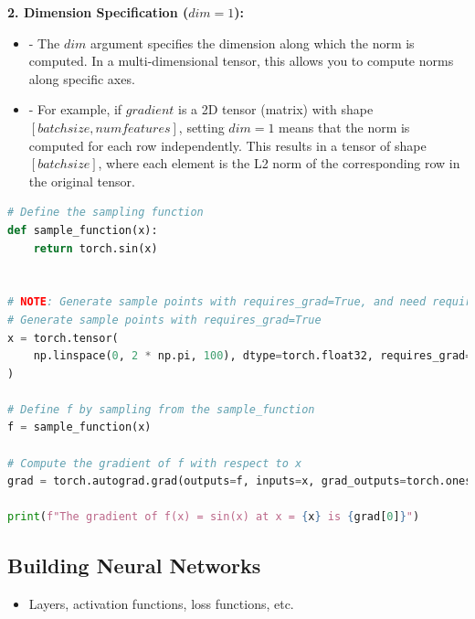 \documentclass{article}
\begin{document}
\textbf{2. Dimension Specification ($dim=1$):} \\

   \begin{itemize}
     \item    - The $dim$ argument specifies the dimension along which the norm is computed. In a multi-dimensional tensor, this allows you to compute norms along specific axes. \\
     \item    - For example, if $gradient$ is a 2D tensor (matrix) with shape $[batch size, num features]$, setting $dim=1$ means that the norm is computed for each row independently.
   This results in a tensor of shape $[batch size]$, where each element is the L2 norm of the corresponding row in the original tensor. \\

   \end{itemize}

\begin{lstlisting}[language=Python, caption=PyTorch gradient sampling example]
# Define the sampling function
def sample_function(x):
    return torch.sin(x)


# NOTE: Generate sample points with requires_grad=True, and need requires_grad=True
# Generate sample points with requires_grad=True
x = torch.tensor(
    np.linspace(0, 2 * np.pi, 100), dtype=torch.float32, requires_grad=True
)

# Define f by sampling from the sample_function
f = sample_function(x)

# Compute the gradient of f with respect to x
grad = torch.autograd.grad(outputs=f, inputs=x, grad_outputs=torch.ones_like(f))

print(f"The gradient of f(x) = sin(x) at x = {x} is {grad[0]}")

\end{lstlisting}

\subsection{Building Neural Networks}
\begin{itemize}
    \item Layers, activation functions, loss functions, etc.
\end{itemize}
\end{document}

